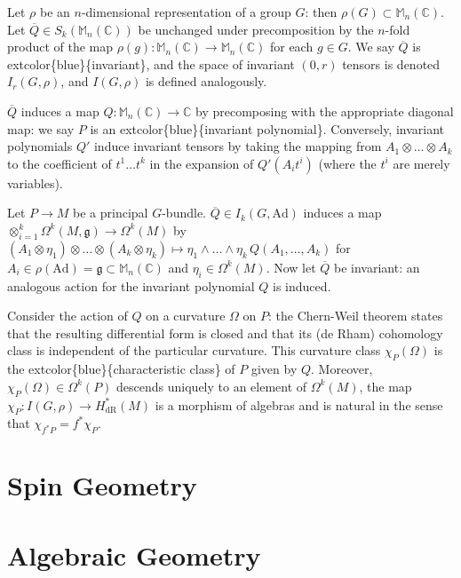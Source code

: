 \documentclass[
]{book}
\begin{document}
Let \(\rho\) be an \(n\)-dimensional representation of a group \(G\): then \(\rho(G) \subset \mathbb{M}_n(\mathbb{C})\). Let \(\overline{Q} \in S_k(\mathbb{M}_n(\mathbb{C}))\) be unchanged under precomposition by the \(n\)-fold product of the map \(\rho(g) : \mathbb{M}_n(\mathbb{C}) \to \mathbb{M}_n(\mathbb{C})\) for each \(g \in G\). We say \(\overline{Q}\) is extcolor\{blue\}\{invariant\}, and the space of invariant \((0,r)\) tensors is denoted \(I_r(G,\rho)\), and \(I(G,\rho)\) is defined analogously.

\(\overline{Q}\) induces a map \(Q : \mathbb{M}_n(\mathbb{C}) \to \mathbb{C}\) by precomposing with the appropriate diagonal map: we say \(P\) is an extcolor\{blue\}\{invariant polynomial\}. Conversely, invariant polynomials \(Q'\) induce invariant tensors by taking the mapping from \(A_1 \otimes \dots \otimes A_k\) to the coefficient of \(t^1 \dots t^k\) in the expansion of \(Q'(A_it^i)\) (where the \(t^i\) are merely variables).

Let \(P \to M\) be a principal \(G\)-bundle. \(\overline{Q} \in I_k(G, \text{Ad})\) induces a map \(\otimes_{i=1}^k \Omega^k(M,\mathfrak{g}) \to \Omega^k(M)\) by \((A_1 \otimes \eta_1) \otimes \dots \otimes (A_k \otimes \eta_k) \mapsto \eta_1 \wedge \dots \wedge \eta_k \, Q(A_1, \dots, A_k)\) for \(A_i \in \rho(\text{Ad}) = \mathfrak{g} \subset \mathbb{M}_n(\mathbb{C})\) and \(\eta_i \in \Omega^k(M)\). Now let \(\overline{Q}\) be invariant: an analogous action for the invariant polynomial \(Q\) is induced.

Consider the action of \(Q\) on a curvature \(\Omega\) on \(P\): the Chern-Weil theorem states that the resulting differential form is closed and that its (de Rham) cohomology class is independent of the particular curvature. This curvature class \(\chi_P(\Omega)\) is the extcolor\{blue\}\{characteristic class\} of \(P\) given by \(Q\). Moreover, \(\chi_P(\Omega) \in \Omega^k(P)\) descends uniquely to an element of \(\Omega^k(M)\), the map \(\chi_P : I(G,\rho) \to H_{\text{dR}}^*(M)\) is a morphism of algebras and is natural in the sense that \(\chi_{f^*P} = f^*\chi_P\).

\hypertarget{spin-geometry}{%
\chapter{Spin Geometry}\label{spin-geometry}}

\hypertarget{algebraic-geometry}{%
\chapter{Algebraic Geometry}\label{algebraic-geometry}}
\end{document}

